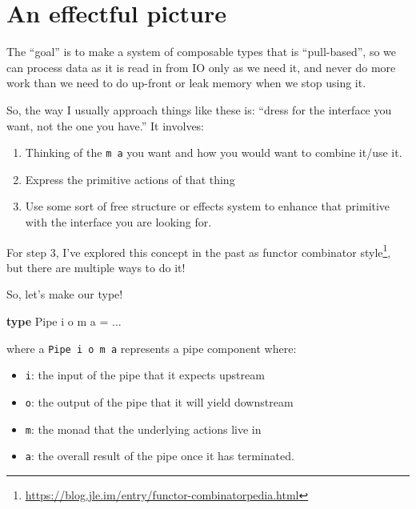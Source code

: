 \documentclass[]{article}
\newenvironment{Shaded}{}{}
\newcommand{\DataTypeTok}[1]{\textcolor[rgb]{0.56,0.13,0.00}{#1}}
\newcommand{\KeywordTok}[1]{\textcolor[rgb]{0.00,0.44,0.13}{\textbf{#1}}}
\newcommand{\NormalTok}[1]{#1}
\newcommand{\OperatorTok}[1]{\textcolor[rgb]{0.40,0.40,0.40}{#1}}
\newcommand{\OtherTok}[1]{\textcolor[rgb]{0.00,0.44,0.13}{#1}}
\renewcommand{\href}[2]{#2\footnote{\url{#1}}}
\begin{document}
\hypertarget{an-effectful-picture}{%
\section{An effectful picture}\label{an-effectful-picture}}

The ``goal'' is to make a system of composable types that is ``pull-based'', so
we can process data as it is read in from IO only as we need it, and never do
more work than we need to do up-front or leak memory when we stop using it.

So, the way I usually approach things like these is: ``dress for the interface
you want, not the one you have.'' It involves:

\begin{enumerate}
\def\labelenumi{\arabic{enumi}.}
\tightlist
\item
  Thinking of the \texttt{m\ a} you want and how you would want to combine
  it/use it.
\item
  Express the primitive actions of that thing
\item
  Use some sort of free structure or effects system to enhance that primitive
  with the interface you are looking for.
\end{enumerate}

For step 3, I've explored this concept in the past as
\href{https://blog.jle.im/entry/functor-combinatorpedia.html}{functor combinator
style}, but there are multiple ways to do it!

So, let's make our type!

\begin{Shaded}
\begin{Highlighting}[]
\KeywordTok{type} \DataTypeTok{Pipe}\NormalTok{ i o m a }\OtherTok{=} \OperatorTok{...}
\end{Highlighting}
\end{Shaded}

where a \texttt{Pipe\ i\ o\ m\ a} represents a pipe component where:

\begin{itemize}
\tightlist
\item
  \texttt{i}: the input of the pipe that it expects upstream
\item
  \texttt{o}: the output of the pipe that it will yield downstream
\item
  \texttt{m}: the monad that the underlying actions live in
\item
  \texttt{a}: the overall result of the pipe once it has terminated.
\end{itemize}
\end{document}
